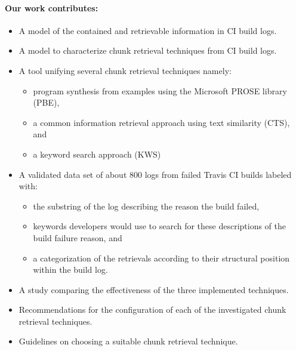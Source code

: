 \documentclass[\myrootdir/main.tex]{subfiles}
\begin{document}
\paragraph{Our work contributes:}
\begin{itemize}
  \item A model of the contained and retrievable information in CI build logs.
  \item A model to characterize chunk retrieval techniques from CI build logs.
  \item A tool unifying several chunk retrieval techniques namely:
        \begin{itemize}
          \item program synthesis from examples using the Microsoft PROSE library (PBE),
          \item a common information retrieval approach using text similarity (CTS), and
          \item a keyword search approach (KWS)
        \end{itemize}
  \item A validated data set of about 800 logs from failed Travis CI builds labeled with:
        \begin{itemize}
          \item the substring of the log describing the reason the build failed,
          \item keywords developers would use to search for these descriptions of the build failure reason, and
          \item a categorization of the retrievals according to their structural position within the build log.
        \end{itemize}
  \item A study comparing the effectiveness of the three implemented techniques.
  \item Recommendations for the configuration of each of the investigated chunk retrieval techniques.
  \item Guidelines on choosing a suitable chunk retrieval technique. %
\end{itemize}
\end{document}
